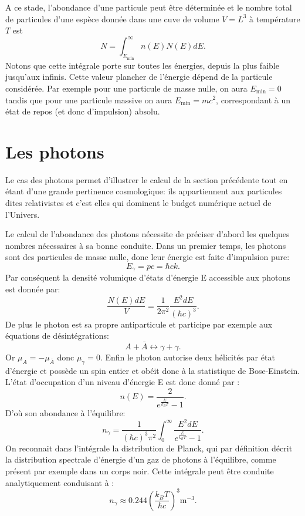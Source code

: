 A ce stade, l'abondance d'une particule peut être déterminée et le nombre total de particules d'une espèce donnée dans une cuve de volume $V=L^3$ à température $T$ est
\begin{equation}
N=\int_{E_{\mathrm{min}}}^\infty n(E)N(E) dE.
\label{e:abondance}
\end{equation}
Notons que cette intégrale porte sur toutes les énergies, depuis la plus faible jusqu'aux infinis. Cette valeur plancher de l'énergie dépend de la particule considérée. Par exemple pour une particule de masse nulle, on aura $E_\mathrm{min}=0$ tandis que pour une particule massive on aura $E_\mathrm{min}=mc^2$, correspondant à un état de repos (et donc d'impulsion) absolu.

\section{Les photons}
Le cas des photons permet d'illustrer le calcul de la section précédente tout en étant d'une grande pertinence cosmologique: ils appartiennent aux particules dites relativistes et c'est elles qui dominent le budget numérique actuel de l'Univers. 

Le calcul de l'abondance des photons nécessite de préciser d'abord les quelques nombres nécessaires à sa bonne conduite. Dans un premier temps, les photons sont des particules de masse nulle, donc leur énergie est faite d'impulsion pure:
\begin{equation}
E_\gamma=pc=\hbar c k.
\end{equation} 
Par conséquent la densité volumique d'états d'énergie E accessible aux photons est donnée par:
\begin{equation}
\frac{N(E)dE}{V}=\frac{1}{2\pi^2}\frac{E^2dE}{(\hbar c)^3}.
\end{equation}
De plus le photon est sa propre antiparticule et participe par exemple aux équations de désintégrations:
\begin{equation}
A + \bar{A} \leftrightarrow \gamma+\gamma.
\end{equation}
Or $\mu_A=-\mu_{\bar{A}}$ donc $\mu_\gamma=0$. Enfin le photon autorise deux hélicités par état d'énergie et possède un spin entier et obéit donc à la statistique de Bose-Einstein. L'état d'occupation d'un niveau d'énergie E est donc donné par :
\begin{equation}
n(E)=\frac{2}{e^{\frac{E}{k_B T}}-1}.
\end{equation}
D'où son abondance à l'équilibre:
\begin{equation}
n_\gamma=\frac{1}{(\hbar c)^3\pi^2}\int_0^\infty\frac{E^2dE}{e^{\frac{E}{k_B T}}-1}.
\end{equation}
On reconnait dans l'intégrale la distribution de Planck, qui par définition décrit la distribution spectrale d'énergie d'un gaz de photons à l'équilibre, comme présent par exemple dans un corps noir. Cette intégrale peut être conduite analytiquement conduisant à :
\begin{equation}
n_\gamma \approx 0.244 \left(\frac{k_BT}{\hbar c}\right)^3 \mathrm{m}^{-3}.
\label{e:densphot}
\end{equation}

